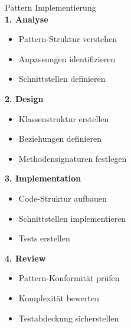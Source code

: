 \begin{KR}{Pattern Implementierung}\\
\textbf{1. Analyse}
\begin{itemize}
   \item Pattern-Struktur verstehen
   \item Anpassungen identifizieren
   \item Schnittstellen definieren
\end{itemize}

\textbf{2. Design}
\begin{itemize}
   \item Klassenstruktur erstellen
   \item Beziehungen definieren
   \item Methodensignaturen festlegen
\end{itemize}

\textbf{3. Implementation}
\begin{itemize}
   \item Code-Struktur aufbauen
   \item Schnittstellen implementieren
   \item Tests erstellen
\end{itemize}

\textbf{4. Review}
\begin{itemize}
   \item Pattern-Konformität prüfen
   \item Komplexität bewerten
   \item Testabdeckung sicherstellen
\end{itemize}
\end{KR}

